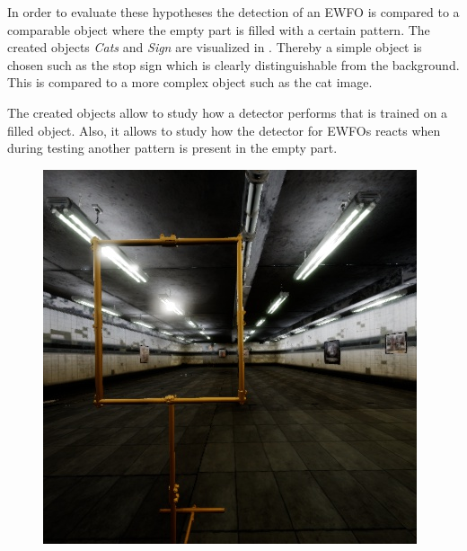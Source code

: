 In order to evaluate these hypotheses the detection of an \ac{EWFO} is compared to a comparable object where the empty part is filled with a certain pattern. The created objects \textit{Cats} and \textit{Sign} are visualized in . Thereby a simple object is chosen such as the stop sign which is clearly distinguishable from the background. This is compared to a more complex object such as the cat image.

The created objects allow to study how a detector performs that is trained on a filled object. Also, it allows to study how the detector for \acp{EWFO} reacts when during testing another pattern is present in the empty part.

\begin{figure}[hbtp]
	\centering
	\begin{minipage}{0.3\textwidth}
		\includegraphics[width=\textwidth]{fig/gate}
	\end{minipage}
	\begin{minipage}{0.3\textwidth}

\end{minipage}
\end{figure}
